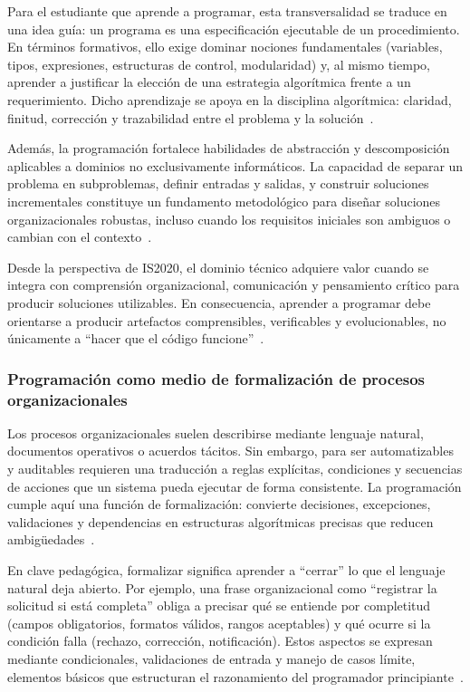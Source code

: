 \documentclass[12pt,twoside]{book}
\begin{document}
					Para el estudiante que aprende a programar, esta transversalidad se traduce en una idea guía: un programa es una especificación ejecutable de un procedimiento. En términos formativos, ello exige dominar nociones fundamentales (variables, tipos, expresiones, estructuras de control, modularidad) y, al mismo tiempo, aprender a justificar la elección de una estrategia algorítmica frente a un requerimiento. Dicho aprendizaje se apoya en la disciplina algorítmica: claridad, finitud, corrección y trazabilidad entre el problema y la solución~\cite{Wirth1976Algorithms,Hanly2015Problem,Gaddis2022Starting}.
					
					Además, la programación fortalece habilidades de abstracción y descomposición aplicables a dominios no exclusivamente informáticos. La capacidad de separar un problema en subproblemas, definir entradas y salidas, y construir soluciones incrementales constituye un fundamento metodológico para diseñar soluciones organizacionales robustas, incluso cuando los requisitos iniciales son ambiguos o cambian con el contexto~\cite{Wing2006Computational,Perkovic2010Framework,Futschek2006Algorithmic}.
					
					Desde la perspectiva de IS2020, el dominio técnico adquiere valor cuando se integra con comprensión organizacional, comunicación y pensamiento crítico para producir soluciones utilizables. En consecuencia, aprender a programar debe orientarse a producir artefactos comprensibles, verificables y evolucionables, no únicamente a “hacer que el código funcione”~\cite{Leidig2021Competency,Leidig2020Updating,Tegarden2025Systems}.
					
					\subsubsection{Programación como medio de formalización de procesos organizacionales}
						\noindent
						Los procesos organizacionales suelen describirse mediante lenguaje natural, documentos operativos o acuerdos tácitos. Sin embargo, para ser automatizables y auditables requieren una traducción a reglas explícitas, condiciones y secuencias de acciones que un sistema pueda ejecutar de forma consistente. La programación cumple aquí una función de formalización: convierte decisiones, excepciones, validaciones y dependencias en estructuras algorítmicas precisas que reducen ambigüedades~\cite{Wirth1976Algorithms,Hanly2015Problem,Gaddis2022Starting}.
						
						En clave pedagógica, formalizar significa aprender a “cerrar” lo que el lenguaje natural deja abierto. Por ejemplo, una frase organizacional como “registrar la solicitud si está completa” obliga a precisar qué se entiende por completitud (campos obligatorios, formatos válidos, rangos aceptables) y qué ocurre si la condición falla (rechazo, corrección, notificación). Estos aspectos se expresan mediante condicionales, validaciones de entrada y manejo de casos límite, elementos básicos que estructuran el razonamiento del programador principiante~\cite{Hanly2015Problem,Gaddis2022Starting,ISO247722024Programming}.
						
\end{document}
